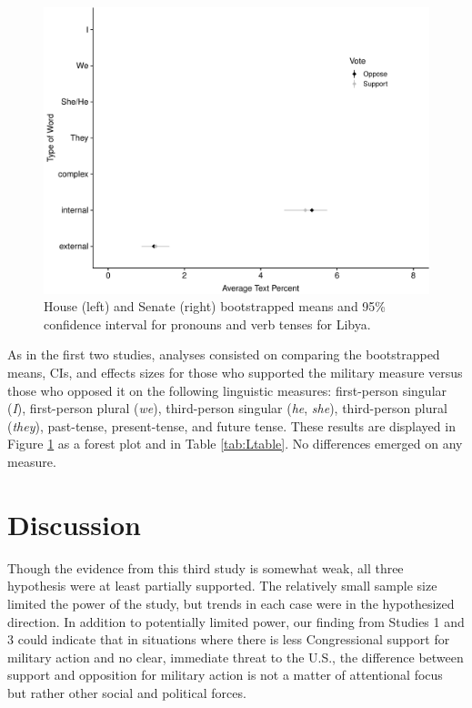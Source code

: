 \documentclass[english,,man,floatsintext]{apa6}
\begin{document}
\begin{figure}
\centering
\includegraphics{Language_of_War_Markdown_KJ2_files/figure-latex/Lpic-1.pdf}
\caption{\label{fig:Lpic}House (left) and Senate (right) bootstrapped means and 95\% confidence interval for pronouns and verb tenses for Libya.}
\end{figure}

As in the first two studies, analyses consisted on comparing the bootstrapped means, CIs, and effects sizes for those who supported the military measure versus those who opposed it on the following linguistic measures: first-person singular (\emph{I}), first-person plural (\emph{we}), third-person singular (\emph{he}, \emph{she}), third-person plural (\emph{they}), past-tense, present-tense, and future tense. These results are displayed in Figure \ref{fig:Lpic} as a forest plot and in Table \ref{tab:Ltable}. No differences emerged on any measure.

\hypertarget{discussion-2}{%
\section{Discussion}\label{discussion-2}}

Though the evidence from this third study is somewhat weak, all three hypothesis were at least partially supported. The relatively small sample size limited the power of the study, but trends in each case were in the hypothesized direction. In addition to potentially limited power, our finding from Studies 1 and 3 could indicate that in situations where there is less Congressional support for military action and no clear, immediate threat to the U.S., the difference between support and opposition for military action is not a matter of attentional focus but rather other social and political forces.
\end{document}
